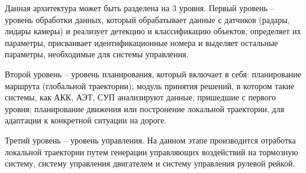 Данная архитектура может быть разделена на 3 уровня. Первый уровень -- уровень обработки данных, который обрабатывает данные с датчиков (радары, лидары камеры) и реализует детекцию и классификацию объектов, определяет их параметры, присваивает идентификационные номера и выделяет остальные параметры, необходимые для системы управления. 

Второй уровень -- уровень планирования, который включает в себя: планирование маршрута (глобальной траектории); модуль принятия решений, в котором такие системы, как АКК, АЭТ, СУП анализируют данные, пришедшие с первого уровня; планирование движения или постронение локальной траектории, для адаптации к конкретной ситуации на дороге. 

Третий уровень -- уровень управления. На данном этапе производится отработка локальной траектории путем генерации управляющих воздействий на тормозную систему, систему управления двигателем и систему управления рулевой рейкой.




